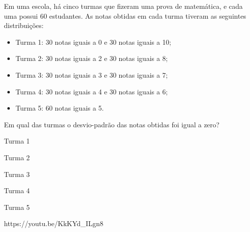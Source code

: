 {Em uma escola, há cinco turmas que fizeram uma prova de matemática, e cada uma possui 60 estudantes. As notas obtidas em cada turma tiveram as seguintes distribuições:
\begin{itemize}
\item Turma 1: 30 notas iguais a 0 e 30 notas iguais a 10;
\item Turma 2: 30 notas iguais a 2 e 30 notas iguais a 8;
\item Turma 3: 30 notas iguais a 3 e 30 notas iguais a 7;
\item Turma 4: 30 notas iguais a 4 e 30 notas iguais a 6;
\item Turma 5: 60 notas iguais a 5.
\end{itemize}
Em qual das turmas o desvio-padrão das notas obtidas foi igual a zero?}
{
\item Turma 1
\item Turma 2
\item Turma 3
\item Turma 4
\item Turma 5}
{https://youtu.be/KkKYd_ILgn8}
